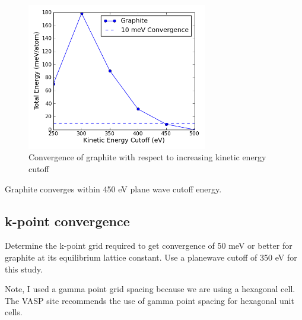 \documentclass[11pt]{article}
\begin{document}
\begin{figure}[H]
\centering
\includegraphics[width=0.7\textwidth]{./2-1.png}
\caption{Convergence of graphite with respect to increasing kinetic energy cutoff}
\end{figure}

Graphite converges within 450 eV plane wave cutoff energy.
\subsection{k-point convergence}
\label{sec-2-2}

   Determine the k-point grid required to get convergence of 50 meV or better for graphite at its equilibrium lattice constant. Use a planewave cutoff of 350 eV for this study.

Note, I used a gamma point grid spacing because we are using a hexagonal cell. The VASP site recommends the use of gamma point spacing for hexagonal unit cells.
\end{document}
